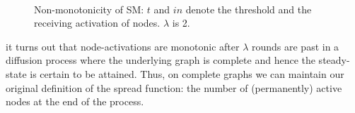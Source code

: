 \documentclass[twocolumn, 10pt]{article}
\begin{document}
\begin{figure}
 \\
\caption{Non-monotonicity of SM: $t$ and $in$ denote the threshold and the receiving activation of nodes. $\lambda$ is 2.}
\label{fig:SM1}
\end{figure}


it turns out that node-activations are monotonic after $\lambda$ rounds are past in a diffusion process where the underlying graph is complete and hence the steady-state is certain to be attained. Thus, on complete graphs we can maintain our original definition of the spread function: the number of (permanently) active nodes at the end of the process. 


\newpage
\end{document}
